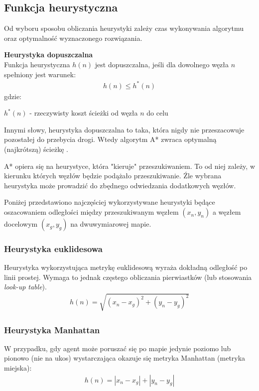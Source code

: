 \subsection{Funkcja heurystyczna}
\label{ch:astar_heurystyki}
Od wyboru sposobu obliczania heurystyki zależy czas wykonywania algorytmu oraz optymalność wyznaczonego rozwiązania.

\begin{definition}{\bf Heurystyka dopuszczalna\\}
	Funkcja heurystyczna $h(n)$ jest dopuszczalna, jeśli dla dowolnego węzła $n$ spełniony jest warunek:
\begin{gather}
 	h(n) \leq h^*(n)
 	\label{eq_astar_heurystyka_admissible} 
\end{gather}
 gdzie:

 $h^*(n)$ - rzeczywisty koszt ścieżki od węzła $n$ do celu
\end{definition}

Innymi słowy, heurystyka dopuszczalna to taka, która nigdy nie przeszacowuje pozostałej do przebycia drogi. Wtedy algorytm A* zwraca optymalną (najkrótszą) ścieżkę \cite{cooppath}.

A* opiera się na heurystyce, która "kieruje" przeszukiwaniem.
To od niej zależy, w kierunku których węzłów będzie podążało przeszukiwanie.
Źle wybrana heurystyka może prowadzić do zbędnego odwiedzania dodatkowych węzłów.

Poniżej przedstawiono najczęściej wykorzystywane heurystyki będące oszacowaniem odległości między przeszukiwanym węzłem $(x_n, y_n)$ a węzłem docelowym $(x_g, y_g)$ na dwuwymiarowej mapie.

\subsubsection{Heurystyka euklidesowa}
Heurystyka wykorzystująca metrykę euklidesową wyraża dokładną odległość po linii prostej. Wymaga to jednak częstego obliczania pierwiastków (lub stosowania {\it look-up table}).
\begin{gather}
 	h(n) = \sqrt{(x_n - x_g)^2 + (y_n - y_g)^2}
 	\label{eq_astar_heu_euc} 
\end{gather}

\subsubsection{Heurystyka Manhattan}
W przypadku, gdy agent może poruszać się po mapie jedynie poziomo lub pionowo (nie na ukos) wystarczająca okazuje się metryka Manhattan (metryka miejska):
\begin{gather}
 	h(n) = |x_n - x_g| + |y_n - y_g|
 	\label{eq_astar_heu_man} 
\end{gather}

